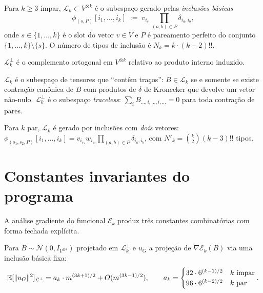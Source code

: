 \documentclass[tensorial.tex]{subfiles}
\providecommand{\sL}{\mathcal{L}}
\providecommand{\sLp}{\mathcal{L}^\perp}
\begin{document}
\begin{definicao}[Subespaço $\sL_k$ (caso $k$ ímpar)]
Para $k \geq 3$ ímpar, $\sL_k \subset V^{\otimes k}$ é o subespaço gerado
pelas \emph{inclusões básicas}
\begin{equation}\label{eq:inclusao}
  \phi_{(s, P)}[i_1, \ldots, i_k] \;:=\; v_{i_s}\, \prod_{(a, b) \in P} \delta_{i_a, i_b},
\end{equation}
onde $s \in \{1, \ldots, k\}$ é o slot do vetor $v \in V$ e $P$ é
pareamento perfeito do conjunto $\{1, \ldots, k\} \setminus \{s\}$.
O número de tipos de inclusão é $N_k = k \cdot (k-2)!!$.

$\sLp_k$ é o complemento ortogonal em $V^{\otimes k}$ relativo ao
produto interno induzido.
\end{definicao}

\begin{proposicao}
$\sL_k$ é o subespaço de tensores que ``contêm traços'': $B \in \sL_k$
se e somente se existe contração canônica de $B$ com produtos de $\delta$
de Kronecker que devolve um vetor não-nulo. $\sLp_k$ é o subespaço
\emph{traceless}: $\sum_i B_{\ldots, i, \ldots, i, \ldots} = 0$ para
toda contração de pares.
\end{proposicao}

\begin{definicao}
Para $k$ par, $\sL_k$ é gerado por inclusões com \emph{dois} vetores:
$\phi_{(s_1, s_2, P)}[i_1, \ldots, i_k] = v_{i_{s_1}} w_{i_{s_2}} \prod_{(a, b) \in P} \delta_{i_a, i_b}$,
com $N'_k = \binom{k}{2} (k-3)!!$ tipos.
\end{definicao}

\section{Constantes invariantes do programa}\label{sec:constantes}

A análise gradiente do funcional $\mathcal{E}_k$ produz três constantes
combinatórias com forma fechada explícita.

\begin{teorema}[Constante $a_k$]\label{thm:a-k-cap1}
Para $B \sim \mathcal{N}(0, I_{V^{\otimes k}})$ projetado em $\sLp_k$ e
$u_G$ a projeção de $\nabla \mathcal{E}_k(B)$ via uma inclusão básica fixa:
\begin{equation}
  \mathbb{E}[\norm{u_G}^2]_{\sLp} = a_k \cdot m^{(3k+1)/2} + O(m^{(3k-1)/2}),
  \qquad a_k = \begin{cases} 32 \cdot 6^{(k-1)/2} & k \text{ ímpar} \\ 96 \cdot 6^{(k-2)/2} & k \text{ par} \end{cases}.
\end{equation}
\end{teorema}
\end{document}
